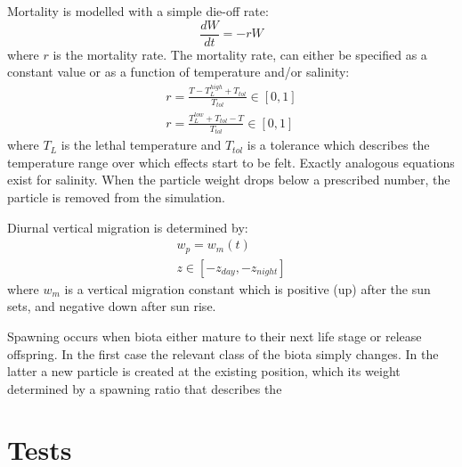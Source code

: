 \documentclass[a4paper]{article}
\begin{document}
Mortality is modelled with a simple die-off rate:
\begin{equation}
\frac{dW}{dt}=-rW
\end{equation}
where $r$ is the mortality rate. The mortality rate, can either be specified as a constant value or as a function of temperature and/or salinity:
\begin{align}
r=\frac{T-T_L^{high}+T_{tol}}{T_{tol}} \in[0,1] \\
r=\frac{T_L^{low}+T_{tol}-T}{T_{tol}} \in[0,1]
\end{align}
where $T_L$ is the lethal temperature and $T_{tol}$ is a tolerance which describes the temperature range over which effects start to be felt.
Exactly analogous equations exist for salinity. When the particle weight drops below a prescribed number, the particle is removed from the simulation.

Diurnal vertical migration is determined by:
\begin{align}
w_p=w_m(t) \\
z \in [-z_{day},-z_{night}]
\end{align}
where $w_m$ is a vertical migration constant which is positive (up) after the sun sets, and negative down after sun rise.

Spawning occurs when biota either mature to their next life stage or release offspring.
In the first case the relevant class of the biota simply changes.
In the latter a new particle is created at the existing position, which its weight determined by a spawning ratio that describes the 

\section{Tests}
\end{document}
